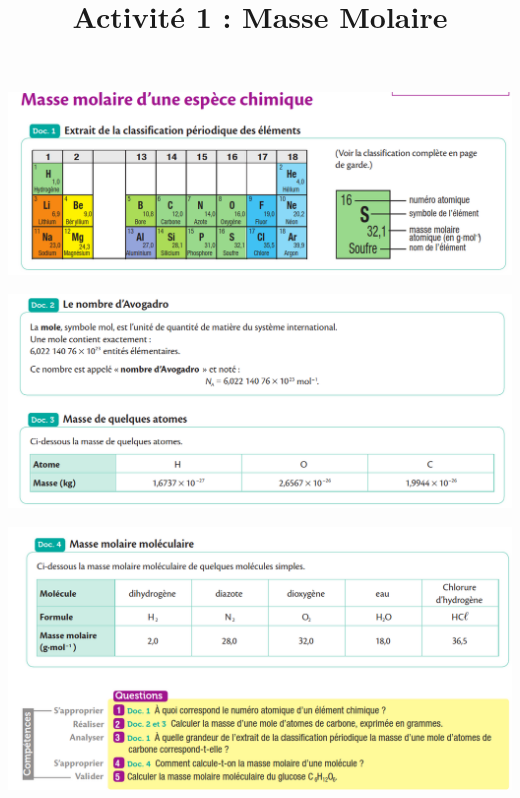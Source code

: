 \documentclass[10pt]{article}
\newcommand{\myscale}{0.5}
\newcommand{\titreActivite}{\huge Activité 1 : Masse Molaire} %
\begin{document}
\date{}
\title{\titreActivite}
\maketitle %



\begin{center}

	\includegraphics[scale=\myscale]{assets/1.png}

	\includegraphics[scale=\myscale]{assets/2.png}

	\includegraphics[scale=\myscale]{assets/3.png}


\end{center}
\end{document}
